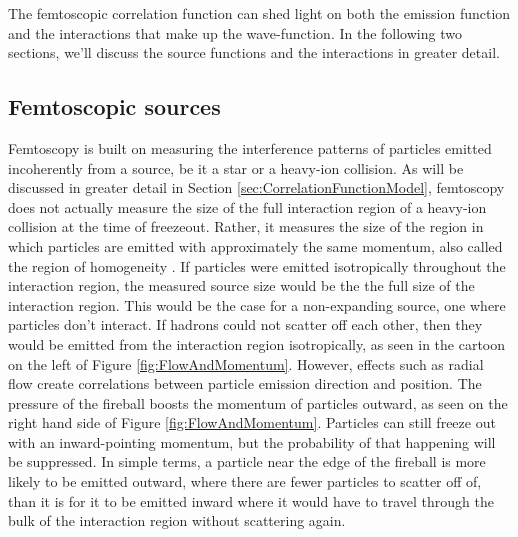 The femtoscopic correlation function can shed light on both the emission function and the interactions that make up the wave-function.
In the following two sections, we'll discuss the source functions and the interactions in greater detail.

\subsection{Femtoscopic sources} %
\label{sec:FemtoSources}

Femtoscopy is built on measuring the interference patterns of particles emitted incoherently from a source, be it a star or a heavy-ion collision.
As will be discussed in greater detail in Section \ref{sec:CorrelationFunctionModel}, femtoscopy does not actually measure the size of the full interaction region of a heavy-ion collision at the time of freezeout.
Rather, it measures the size of the region in which particles are emitted with approximately the same momentum, also called the region of homogeneity \cite{Akkelin:1995gh}.
If particles were emitted isotropically throughout the interaction region, the measured source size would be the the full size of the interaction region.
This would be the case for a non-expanding source, one where particles don't interact.
If hadrons could not scatter off each other, then they would be emitted from the interaction region isotropically, as seen in the cartoon on the left of Figure \ref{fig:FlowAndMomentum}.
However, effects such as radial flow create correlations between particle emission direction and position. 
The pressure of the fireball boosts the momentum of particles outward, as seen on the right hand side of Figure \ref{fig:FlowAndMomentum}.
Particles can still freeze out with an inward-pointing momentum, but the probability of that happening will be suppressed.
In simple terms, a particle near the edge of the fireball is more likely to be emitted outward, where there are fewer particles to scatter off of, than it is for it to be emitted inward where it would have to travel through the bulk of the interaction region without scattering again. 

